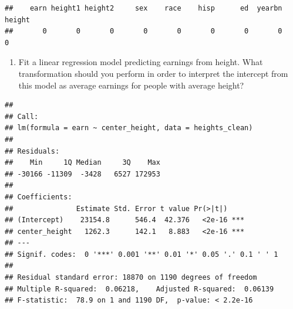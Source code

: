 \documentclass[]{article}
\newenvironment{Shaded}{\begin{snugshade}}{\end{snugshade}}
\newcommand{\KeywordTok}[1]{\textcolor[rgb]{0.13,0.29,0.53}{\textbf{#1}}}
\newcommand{\DataTypeTok}[1]{\textcolor[rgb]{0.13,0.29,0.53}{#1}}
\newcommand{\DecValTok}[1]{\textcolor[rgb]{0.00,0.00,0.81}{#1}}
\newcommand{\CommentTok}[1]{\textcolor[rgb]{0.56,0.35,0.01}{\textit{#1}}}
\newcommand{\OperatorTok}[1]{\textcolor[rgb]{0.81,0.36,0.00}{\textbf{#1}}}
\newcommand{\NormalTok}[1]{#1}
\providecommand{\tightlist}{%
  \setlength{\itemsep}{0pt}\setlength{\parskip}{0pt}}
\begin{document}
\begin{verbatim}
##    earn height1 height2     sex    race    hisp      ed  yearbn  height 
##       0       0       0       0       0       0       0       0       0
\end{verbatim}

\begin{Shaded}
\end{Shaded}

\begin{enumerate}
\def\labelenumi{\arabic{enumi}.}
\setcounter{enumi}{1}
\tightlist
\item
  Fit a linear regression model predicting earnings from height. What
  transformation should you perform in order to interpret the intercept
  from this model as average earnings for people with average height?
\end{enumerate}

\begin{Shaded}
\end{Shaded}

\begin{verbatim}
## 
## Call:
## lm(formula = earn ~ center_height, data = heights_clean)
## 
## Residuals:
##    Min     1Q Median     3Q    Max 
## -30166 -11309  -3428   6527 172953 
## 
## Coefficients:
##               Estimate Std. Error t value Pr(>|t|)    
## (Intercept)    23154.8      546.4  42.376   <2e-16 ***
## center_height   1262.3      142.1   8.883   <2e-16 ***
## ---
## Signif. codes:  0 '***' 0.001 '**' 0.01 '*' 0.05 '.' 0.1 ' ' 1
## 
## Residual standard error: 18870 on 1190 degrees of freedom
## Multiple R-squared:  0.06218,    Adjusted R-squared:  0.06139 
## F-statistic:  78.9 on 1 and 1190 DF,  p-value: < 2.2e-16
\end{verbatim}
\end{document}
